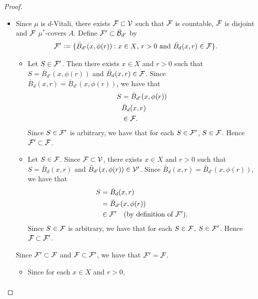 \documentclass{book}
\begin{document}
\begin{proof}
\begin{itemize}
\begin{itemize}
				\begin{align*}
					0
					& \leq \inf \{r > 0: \bar{B}_d(x, r) \in \MV\} \\
					& \leq r' \\
					& < \del. 
				\end{align*}
				Since $\del > 0$ is arbitrary, we have that $\inf \{r > 0: \bar{B}_d(x, r) \in \MV\} = 0$. Thus $\MV$ is $d$-fine at $x$. Since $x \in A$ is arbitrary, we have that for each $x \in A$, $\MV$ is fine at $x$. Therefore $\MV$ is fine on $A$.
				\item Since $\mu$ is $d$-Vitali, there exists $\mathcal{F} \subset \mathcal{V}$ such that $\mathcal{F}$ is countable, $\mathcal{F}$ is disjoint and $\mathcal{F}$ $\mu^*$-covers $A$. Define $\mathcal{F}' \subset \bar{\mathcal{B}}_{d'}$ by 
				$$\mathcal{F}' \vcentcolon= \{\bar{B}_{d'}(x, \phi(r)): \text{$x \in X$, $r >0$ and $\bar{B}_d(x,r) \in \mathcal{F}$}\}.$$ 
				\begin{itemize}
					\item Let $S \in \mathcal{F}'$. Then there exists $x \in X$ and $r > 0$ such that $S = \bar{B}_{d'}(x,\phi(r))$ and $\bar{B}_d(x,r) \in \mathcal{F}$. Since $\bar{B}_d(x,r) = \bar{B}_{d'}(x, \phi(r))$, we have that
					\begin{align*}
						S 
						& = \bar{B}_{d'}(x,\phi(r)) \\
						& \bar{B}_d(x,r) \\
						& \in \mathcal{F}. 
					\end{align*}
					Since $S \in \mathcal{F}'$ is arbitrary, we have that for each $S \in \mathcal{F}'$, $S \in \mathcal{F}$. Hence $\mathcal{F}' \subset \mathcal{F}$. 
					\item Let $S \in \mathcal{F}$. Since $\mathcal{F} \subset \mathcal{V}$, there exists $x \in X$ and $r > 0$ such that $S = \bar{B}_d(x, r)$ and $\bar{B}_{d'}(x,\phi(r)) \in \mathcal{V}'$. Since $\bar{B}_d(x,r) = \bar{B}_{d'}(x, \phi(r))$, we have that 
					\begin{align*}
						S
						& = \bar{B}_d(x, r) \\
						& = \bar{B}_{d'}(x, \phi(r)) \\
						& \in \mathcal{F}' \quad \text{(by definition of $\mathcal{F}'$)}.
					\end{align*}
					Since $S \in \mathcal{F}$ is arbitrary, we have that for each $S \in \mathcal{F}$, $S \in \mathcal{F}'$. Hence $\mathcal{F} \subset \mathcal{F}'$.
				\end{itemize}
				Since $\mathcal{F}' \subset \mathcal{F}$ and $\mathcal{F} \subset \mathcal{F}'$, we have that $\mathcal{F}' = \mathcal{F}$. 
				\begin{itemize}
					\item Since for each $x \in X$ and $r>0$, 
					\begin{align*}

\end{align*}
\end{itemize}
\end{itemize}
\end{itemize}
\end{proof}
\end{document}
